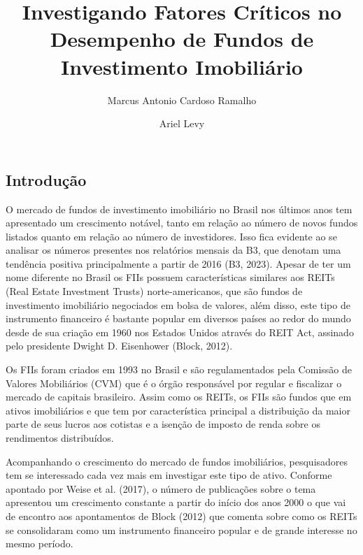 \documentclass[
  12pt,
  letterpaper,
  DIV=11,
  numbers=noendperiod]{scrartcl}
\title{\fontsize{12pt}{14pt}\selectfont Investigando Fatores Críticos no
Desempenho de Fundos de Investimento Imobiliário}
\author{\fontsize{12pt}{14pt}\selectfont Marcus Antonio Cardoso
Ramalho \and \fontsize{12pt}{14pt}\selectfont Ariel Levy}
\date{}
\begin{document}
\maketitle

\thispagestyle{fancy}

\hypersetup{
    colorlinks=true,
    linkcolor=black,
    filecolor=black,      
    urlcolor=black,
    citecolor=black,
}

\subsection{Introdução}\label{introduuxe7uxe3o}

O mercado de fundos de investimento imobiliário no Brasil nos últimos
anos tem apresentado um crescimento notável, tanto em relação ao número
de novos fundos listados quanto em relação ao número de investidores.
Isso fica evidente ao se analisar os números presentes nos relatórios
mensais da B3, que denotam uma tendência positiva principalmente a
partir de 2016 (B3, 2023). Apesar de ter um nome diferente no Brasil os
FIIs possuem características similares aos REITs (Real Estate Investment
Trusts) norte-americanos, que são fundos de investimento imobiliário
negociados em bolsa de valores, além disso, este tipo de instrumento
financeiro é bastante popular em diversos países ao redor do mundo desde
de sua criação em 1960 nos Estados Unidos através do REIT Act, assinado
pelo presidente Dwight D. Eisenhower (Block, 2012).

Os FIIs foram criados em 1993 no Brasil e são regulamentados pela
Comissão de Valores Mobiliários (CVM) que é o órgão responsável por
regular e fiscalizar o mercado de capitais brasileiro. Assim como os
REITs, os FIIs são fundos que em ativos imobiliários e que tem por
característica principal a distribuição da maior parte de seus lucros
aos cotistas e a isenção de imposto de renda sobre os rendimentos
distribuídos.

Acompanhando o crescimento do mercado de fundos imobiliários,
pesquisadores tem se interessado cada vez mais em investigar este tipo
de ativo. Conforme apontado por Weise et al. (2017), o número de
publicações sobre o tema apresentou um crescimento constante a partir do
início dos anos 2000 o que vai de encontro aos apontamentos de Block
(2012) que comenta sobre como os REITs se consolidaram como um
instrumento financeiro popular e de grande interesse no mesmo período.
\end{document}
